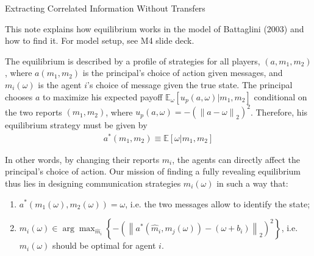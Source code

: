 \documentclass{article}
\begin{document}
\begin{center}
	{\Huge Extracting Correlated Information Without Transfers}
\end{center}
\bigskip

This note explains how equilibrium works in the model of Battaglini (2003) and how to find it. For model setup, see M4 slide deck.

The equilibrium is described by a profile of strategies for all players, $(a,m_1,m_2)$, where $a(m_1,m_2)$ is the principal's choice of action given messages, and $m_i(\omega)$ is the agent $i$'s choice of message given the true state. The principal chooses $a$ to maximize his expected payoff $\mathbb{E}_\omega [u_p(a,\omega)|m_1,m_2]$ conditional on the two reports $(m_1,m_2)$, where $u_p(a,\omega) = -\left(\left\| a - \omega \right\|_2\right)^2$. Therefore, his equilibrium strategy must be given by
\begin{align}
	a^*(m_1,m_2) \equiv \mathbb{E} \left[ \omega | m_1, m_2 \right]
	\label{eq:optact}
\end{align}

In other words, by changing their reports $m_i$, the agents can directly affect the principal's choice of action. Our mission of finding a fully revealing equilibrium thus lies in designing communication strategies $m_i(\omega)$ in such a way that:
\begin{enumerate}
	\item $a^*(m_1(\omega),m_2(\omega)) = \omega$, i.e. the two messages allow to identify the state;
	\item $m_i(\omega) \in \arg \max_{\hat{m}_i} \left\{ -\left(\left\| a^*(\hat{m}_i,m_j(\omega)) - (\omega + b_i) \right\|_2\right)^2 \right\}$, i.e. $m_i(\omega)$ should be optimal for agent $i$.
\end{enumerate}
\end{document}

